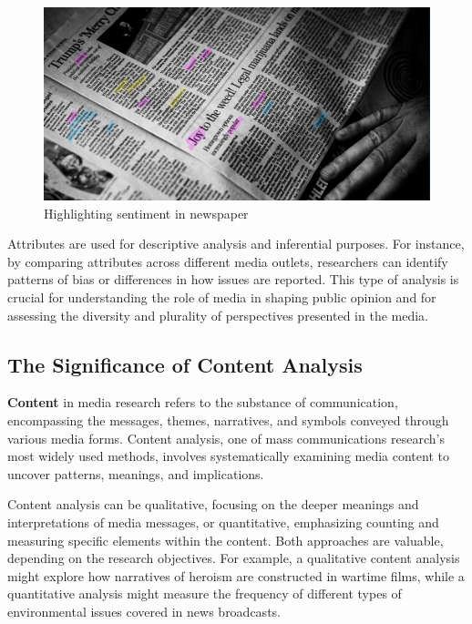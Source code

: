 \documentclass[
]{book}
\begin{document}
\begin{figure}
\centering
\includegraphics[width=1\textwidth,height=\textheight]{images/fig01a.jpg}
\caption{Highlighting sentiment in newspaper}
\end{figure}

Attributes are used for descriptive analysis and inferential purposes. For instance, by comparing attributes across different media outlets, researchers can identify patterns of bias or differences in how issues are reported. This type of analysis is crucial for understanding the role of media in shaping public opinion and for assessing the diversity and plurality of perspectives presented in the media.

\subsection*{The Significance of Content Analysis}\label{the-significance-of-content-analysis}

\textbf{Content} in media research refers to the substance of communication, encompassing the messages, themes, narratives, and symbols conveyed through various media forms. Content analysis, one of mass communications research's most widely used methods, involves systematically examining media content to uncover patterns, meanings, and implications.

Content analysis can be qualitative, focusing on the deeper meanings and interpretations of media messages, or quantitative, emphasizing counting and measuring specific elements within the content. Both approaches are valuable, depending on the research objectives. For example, a qualitative content analysis might explore how narratives of heroism are constructed in wartime films, while a quantitative analysis might measure the frequency of different types of environmental issues covered in news broadcasts.
\end{document}
